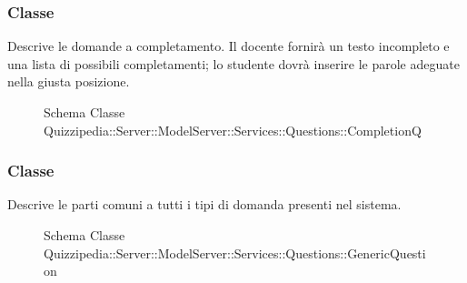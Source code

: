 \subsubsection{Classe }
Descrive le domande a completamento. Il docente fornirà un testo incompleto e una lista di possibili completamenti; lo studente dovrà inserire le parole adeguate nella giusta posizione.
\begin{figure}[H]
\centering
\noindent{}
\caption[Schema Classe CompletionQ]{Schema Classe Quizzipedia::Server::ModelServer::Services::Questions::CompletionQ}
\end{figure}
\subsubsection{Classe }
Descrive le parti comuni a tutti i tipi di domanda presenti nel sistema.
\begin{figure}[H]
\centering
\noindent{}
\caption[Schema Classe GenericQuestion]{Schema Classe Quizzipedia::Server::ModelServer::Services::Questions::GenericQuestion}
\end{figure}
